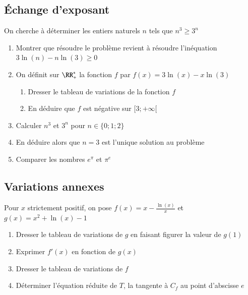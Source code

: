 \documentclass[oneside,12pt]{article}          %
\begin{document}
\subsection{Échange d'exposant}
On cherche à déterminer les entiers naturels $n$ tels que $n^3\geq3^n$
\begin{enumerate}
    \item Montrer que résoudre le problème revient à résoudre l'inéquation $3\ln(n)-n\ln(3)\geq0$
    \item On définit sur $\RR_+^*$ la fonction $f$ par $f(x)=3\ln(x)-x\ln(3)$
    \begin{enumerate}
        \item Dresser le tableau de variations de la fonction $f$
        \item En déduire que $f$ est négative sur $[3;+\infty[$
    \end{enumerate}
    \item Calculer $n^3$ et $3^n$ pour $n\in\{0;1;2\}$
    \item En déduire alors que $n=3$ est l'unique solution au problème
    \item [($\star$)] Comparer les nombres $e^{\pi}$ et $\pi^e$
\end{enumerate}



\subsection{Variations annexes}
Pour $x$ strictement positif, on pose $f(x) = x - \frac{\ln(x)}{x}$ et $g(x)=x^2+\ln(x)-1$
\begin{enumerate}
    \item Dresser le tableau de variations de $g$ en faisant figurer la valeur de $g(1)$
    \item Exprimer $f'(x)$ en fonction de $g(x)$
    \item Dresser le tableau de variations de $f$
    \item Déterminer l'équation réduite de $T$, la tangente à $C_f$ au point d'abscisse $e$
\end{enumerate}
\end{document}
